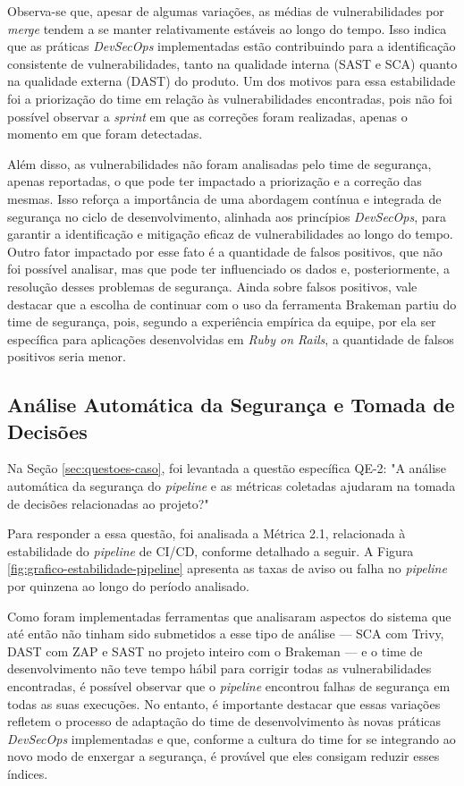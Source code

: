 Observa-se que, apesar de algumas variações, as médias de vulnerabilidades por \textit{merge} tendem a se manter relativamente estáveis ao longo do tempo. Isso indica que as práticas \textit{DevSecOps} implementadas estão contribuindo para a identificação consistente de vulnerabilidades, tanto na qualidade interna (SAST e SCA) quanto na qualidade externa (DAST) do produto. Um dos motivos para essa estabilidade foi a priorização do time em relação às vulnerabilidades encontradas, pois não foi possível observar a \textit{sprint} em que as correções foram realizadas, apenas o momento em que foram detectadas.

Além disso, as vulnerabilidades não foram analisadas pelo time de segurança, apenas reportadas, o que pode ter impactado a priorização e a correção das mesmas. Isso reforça a importância de uma abordagem contínua e integrada de segurança no ciclo de desenvolvimento, alinhada aos princípios \textit{DevSecOps}, para garantir a identificação e mitigação eficaz de vulnerabilidades ao longo do tempo. Outro fator impactado por esse fato é a quantidade de falsos positivos, que não foi possível analisar, mas que pode ter influenciado os dados e, posteriormente, a resolução desses problemas de segurança. Ainda sobre falsos positivos, vale destacar que a escolha de continuar com o uso da ferramenta Brakeman partiu do time de segurança, pois, segundo a experiência empírica da equipe, por ela ser específica para aplicações desenvolvidas em \textit{Ruby on Rails}, a quantidade de falsos positivos seria menor.

\subsection{Análise Automática da Segurança e Tomada de Decisões} 
Na Seção \ref{sec:questoes-caso}, foi levantada a questão específica QE-2: "A análise automática da segurança do \textit{pipeline} e as métricas coletadas ajudaram na tomada de decisões relacionadas ao projeto?"

Para responder a essa questão, foi analisada a Métrica 2.1, relacionada à estabilidade do \textit{pipeline} de CI/CD, conforme detalhado a seguir. A Figura \ref{fig:grafico-estabilidade-pipeline} apresenta as taxas de aviso ou falha no \textit{pipeline} por quinzena ao longo do período analisado.

Como foram implementadas ferramentas que analisaram aspectos do sistema que até então não tinham sido submetidos a esse tipo de análise — SCA com Trivy, DAST com ZAP e SAST no projeto inteiro com o Brakeman — e o time de desenvolvimento não teve tempo hábil para corrigir todas as vulnerabilidades encontradas, é possível observar que o \textit{pipeline} encontrou falhas de segurança em todas as suas execuções. No entanto, é importante destacar que essas variações refletem o processo de adaptação do time de desenvolvimento às novas práticas \textit{DevSecOps} implementadas e que, conforme a cultura do time for se integrando ao novo modo de enxergar a segurança, é provável que eles consigam reduzir esses índices.


